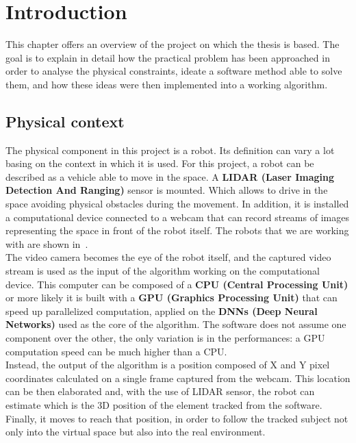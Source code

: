 \chapter{Introduction} \label{cha:introduction}
This chapter offers an overview of the project on which the thesis is based. The goal is to explain in detail how the practical problem has been approached in order to analyse the physical constraints, ideate a software method able to solve them, and how these ideas were then implemented into a working algorithm. 


\section{Physical context}
The physical component in this project is a robot. Its definition can vary a lot basing on the context in which it is used. For this project, a robot can be described as a vehicle able to move in the space. A \textbf{LIDAR (Laser Imaging Detection And Ranging)} sensor is mounted. Which allows to drive in the space avoiding physical obstacles during the movement. In addition, it is installed a computational device connected to a webcam that can record streams of images representing the space in front of the robot itself. The robots that we are working with are shown in~.\\
The video camera becomes the eye of the robot itself, and the captured video stream is used as the input of the algorithm working on the computational device. This computer can be composed of a \textbf{CPU (Central Processing Unit)} or more likely it is built with a \textbf{GPU (Graphics Processing Unit)} that can speed up parallelized computation, applied on the \textbf{DNNs (Deep Neural Networks)} used as the core of the algorithm. The software does not assume one component over the other, the only variation is in the performances: a GPU computation speed can be much higher than a CPU.\\
Instead, the output of the algorithm is a position composed of X and Y pixel coordinates calculated on a single frame captured from the webcam. This location can be then elaborated and, with the use of LIDAR sensor, the robot can estimate which is the 3D position of the element tracked from the software.\\
Finally, it moves to reach that position, in order to follow the tracked subject not only into the virtual space but also into the real environment.

